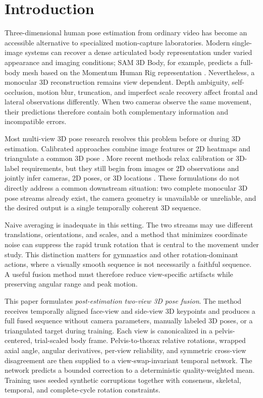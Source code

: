 \section{Introduction}
\label{sec:introduction}

Three-dimensional human pose estimation from ordinary video has become an
accessible alternative to specialized motion-capture laboratories. Modern
single-image systems can recover a dense articulated body representation under
varied appearance and imaging conditions; SAM 3D Body, for example, predicts a
full-body mesh based on the Momentum Human Rig representation
\citep{Yang2026SAM3DBody}. Nevertheless, a monocular 3D reconstruction remains
view dependent. Depth ambiguity, self-occlusion, motion blur, truncation, and
imperfect scale recovery affect frontal and lateral observations differently.
When two cameras observe the same movement, their predictions therefore contain
both complementary information and incompatible errors.

Most multi-view 3D pose research resolves this problem before or during 3D
estimation. Calibrated approaches combine image features or 2D heatmaps and
triangulate a common 3D pose \citep{Iskakov2019Learnable,Qiu2019CrossView,
Remelli2020Lightweight}. More recent methods relax calibration or 3D-label
requirements, but they still begin from images or 2D observations and jointly
infer cameras, 2D poses, or 3D locations
\citep{Kim2022CrossViewSelfFusion,Usman2022MetaPose,Jiang2023Probabilistic,
Srivastav2024SelfPose3D}. These formulations do not directly address a common
downstream situation: two complete monocular 3D pose streams already exist, the
camera geometry is unavailable or unreliable, and the desired output is a
single temporally coherent 3D sequence.

Naive averaging is inadequate in this setting. The two streams may use
different translations, orientations, and scales, and a method that minimizes
coordinate noise can suppress the rapid trunk rotation that is central to the
movement under study. This distinction matters for gymnastics and other
rotation-dominant actions, where a visually smooth sequence is not necessarily
a faithful sequence. A useful fusion method must therefore reduce view-specific
artifacts while preserving angular range and peak motion.

This paper formulates \emph{post-estimation two-view 3D pose fusion}. The method
receives temporally aligned face-view and side-view 3D keypoints and produces a
full fused sequence without camera parameters, manually labeled 3D poses, or a
triangulated target during training. Each view is canonicalized in a
pelvis-centered, trial-scaled body frame. Pelvis-to-thorax relative rotations,
wrapped axial angle, angular derivatives, per-view reliability, and symmetric
cross-view disagreement are then supplied to a view-swap-invariant temporal
network. The network predicts a bounded correction to a deterministic
quality-weighted mean. Training uses seeded synthetic corruptions together with
consensus, skeletal, temporal, and complete-cycle rotation constraints.

